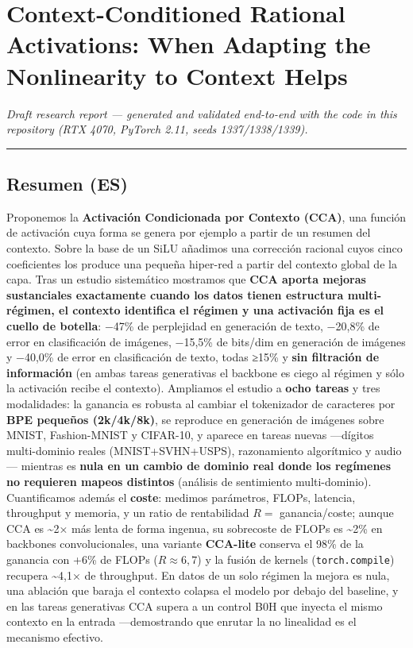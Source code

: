 \documentclass[
  11pt,
]{article}
\author{}
\date{}
\begin{document}
{
\setcounter{tocdepth}{3}
\tableofcontents
}
\section{Context-Conditioned Rational Activations: When Adapting the
Nonlinearity to Context
Helps}\label{context-conditioned-rational-activations-when-adapting-the-nonlinearity-to-context-helps}

\emph{Draft research report --- generated and validated end-to-end with
the code in this repository (RTX 4070, PyTorch 2.11, seeds
1337/1338/1339).}

\begin{center}\rule{0.5\linewidth}{0.5pt}\end{center}

\subsection{Resumen (ES)}\label{resumen-es}

Proponemos la \textbf{Activación Condicionada por Contexto (CCA)}, una
función de activación cuya forma se genera por ejemplo a partir de un
resumen del contexto. Sobre la base de un SiLU añadimos una corrección
racional cuyos cinco coeficientes los produce una pequeña hiper-red a
partir del contexto global de la capa. Tras un estudio sistemático
mostramos que \textbf{CCA aporta mejoras sustanciales exactamente cuando
los datos tienen estructura multi-régimen, el contexto identifica el
régimen y una activación fija es el cuello de botella}: −47\% de
perplejidad en generación de texto, −20,8\% de error en clasificación de
imágenes, −15,5\% de bits/dim en generación de imágenes y −40,0\% de
error en clasificación de texto, todas ≥15\% y \textbf{sin filtración de
información} (en ambas tareas generativas el backbone es ciego al
régimen y sólo la activación recibe el contexto). Ampliamos el estudio a
\textbf{ocho tareas} y tres modalidades: la ganancia es robusta al
cambiar el tokenizador de caracteres por \textbf{BPE pequeños
(2k/4k/8k)}, se reproduce en generación de imágenes sobre MNIST,
Fashion-MNIST y CIFAR-10, y aparece en tareas nuevas ---dígitos
multi-dominio reales (MNIST+SVHN+USPS), razonamiento algorítmico y
audio--- mientras es \textbf{nula en un cambio de dominio real donde los
regímenes no requieren mapeos distintos} (análisis de sentimiento
multi-dominio). Cuantificamos además el \textbf{coste}: medimos
parámetros, FLOPs, latencia, throughput y memoria, y un ratio de
rentabilidad \(R=\) ganancia/coste; aunque CCA es \textasciitilde2× más
lenta de forma ingenua, su sobrecoste de FLOPs es \textasciitilde2\% en
backbones convolucionales, una variante \textbf{CCA-lite} conserva el
98\% de la ganancia con +6\% de FLOPs (\(R\approx6{,}7\)) y la fusión de
kernels (\texttt{torch.compile}) recupera \textasciitilde4,1× de
throughput. En datos de un solo régimen la mejora es nula, una ablación
que baraja el contexto colapsa el modelo por debajo del baseline, y en
las tareas generativas CCA supera a un control B0H que inyecta el mismo
contexto en la entrada ---demostrando que enrutar la no linealidad es el
mecanismo efectivo.
\end{document}
